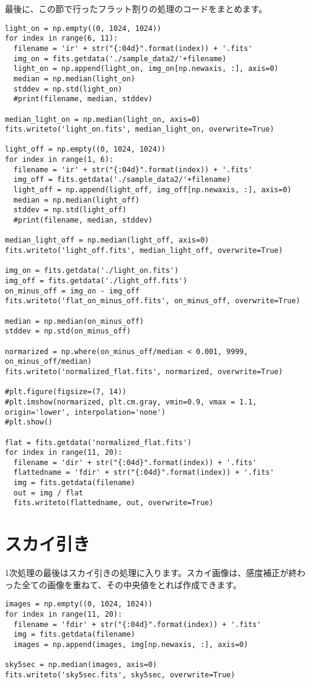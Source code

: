 最後に、この節で行ったフラット割りの処理のコードをまとめます。
\begin{lstlisting}[caption=\ref{sec_3_4}~節のまとめ,label=code_3_4_6]
light_on = np.empty((0, 1024, 1024))
for index in range(6, 11):
  filename = 'ir' + str("{:04d}".format(index)) + '.fits'
  img_on = fits.getdata('./sample_data2/'+filename)
  light_on = np.append(light_on, img_on[np.newaxis, :], axis=0)
  median = np.median(light_on)
  stddev = np.std(light_on)
  #print(filename, median, stddev)

median_light_on = np.median(light_on, axis=0)
fits.writeto('light_on.fits', median_light_on, overwrite=True)

light_off = np.empty((0, 1024, 1024))
for index in range(1, 6):
  filename = 'ir' + str("{:04d}".format(index)) + '.fits'
  img_off = fits.getdata('./sample_data2/'+filename)
  light_off = np.append(light_off, img_off[np.newaxis, :], axis=0)
  median = np.median(light_off)
  stddev = np.std(light_off)
  #print(filename, median, stddev)

median_light_off = np.median(light_off, axis=0)
fits.writeto('light_off.fits', median_light_off, overwrite=True)

img_on = fits.getdata('./light_on.fits')
img_off = fits.getdata('./light_off.fits')
on_minus_off = img_on - img_off
fits.writeto('flat_on_minus_off.fits', on_minus_off, overwrite=True)

median = np.median(on_minus_off)
stddev = np.std(on_minus_off)

normarized = np.where(on_minus_off/median < 0.001, 9999, on_minus_off/median)
fits.writeto('normalized_flat.fits', normarized, overwrite=True)

#plt.figure(figsize=(7, 14))
#plt.imshow(normarized, plt.cm.gray, vmin=0.9, vmax = 1.1, origin='lower', interpolation='none')
#plt.show()

flat = fits.getdata('normalized_flat.fits')
for index in range(11, 20):
  filename = 'dir' + str("{:04d}".format(index)) + '.fits'
  flattedname = 'fdir' + str("{:04d}".format(index)) + '.fits'
  img = fits.getdata(filename)
  out = img / flat
  fits.writeto(flattedname, out, overwrite=True)
\end{lstlisting}

\section{スカイ引き}
\label{sec_3_5}
1次処理の最後はスカイ引きの処理に入ります。スカイ画像は、感度補正が終わった全ての画像を重ねて、その中央値をとれば作成できます。
\begin{lstlisting}[caption=スカイ画像の作成,label=code_3_5_1]
images = np.empty((0, 1024, 1024))
for index in range(11, 20):
  filename = 'fdir' + str("{:04d}".format(index)) + '.fits'
  img = fits.getdata(filename)
  images = np.append(images, img[np.newaxis, :], axis=0)

sky5sec = np.median(images, axis=0)
fits.writeto('sky5sec.fits', sky5sec, overwrite=True)
\end{lstlisting}

